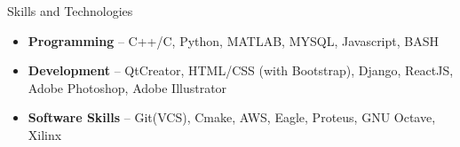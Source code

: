 \documentclass[]{mcdowellcv}
\begin{document}
	\begin{cvsection}{Skills and Technologies}
		\begin{cvsubsection}{}{}{}	
			\begin{itemize}
				\item \textbf{Programming} -- C++/C, Python, MATLAB, MYSQL, Javascript, BASH
				\item \textbf{Development} -- QtCreator, HTML/CSS (with Bootstrap), Django, ReactJS, Adobe Photoshop, Adobe Illustrator
			    \item \textbf{Software Skills} -- Git(VCS), Cmake, AWS, Eagle, Proteus, GNU Octave, Xilinx
			\end{itemize}
		\end{cvsubsection}
	\end{cvsection}
	
\end{document}
